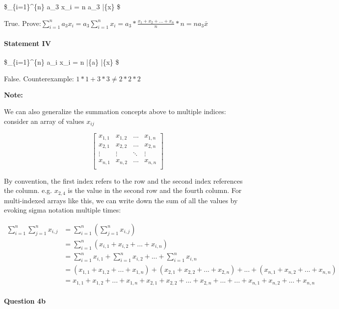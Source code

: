 \documentclass[11pt]{article}
\begin{document}
\$\sum\_\{i=1\}\^{}\{n\} a\_3 x\_i = n a\_3 \bar\{x\} \$

    True.
Prove:\(\sum_{i=1}^na_3x_i=a_3\sum_{i=1}^nx_i=a_3*\frac{x_1+x_2+...+x_n}{n}*n=na_3\bar x\)

    \paragraph{Statement IV}\label{statement-iv}

\$\sum\_\{i=1\}\^{}\{n\} a\_i x\_i = n \bar\{a\} \bar\{x\} \$

    False. Counterexample: \(1*1+3*3 \neq 2*2*2\)

    \textbf{Note:}

We can also generalize the summation concepts above to multiple indices:
consider an array of values \(x_{ij}\)

\[ \begin{bmatrix} x_{1,1} & x_{1, 2} & ... & x_{1, n} \\ 
x_{2,1} & x_{2, 2} & ... & x_{2, n} \\ 
\vdots  & \vdots   & \ddots & \vdots   \\ 
x_{n,1} & x_{n, 2} & ... & x_{n, n} \\ 
\end{bmatrix} \]

By convention, the first index refers to the row and the second index
references the column. e.g. \(x_{2, 4}\) is the value in the second row
and the fourth column. For multi-indexed arrays like this, we can write
down the sum of all the values by evoking sigma notation multiple times:

\begin{align*} 
    \sum_{i=1}^{n} \sum_{j=1}^{n} x_{i,j}
    &= \sum_{i=1}^{n} \left(\sum_{j=1}^{n} x_{i,j} \right) \\
    &= \sum_{i=1}^{n} \left(x_{i,1} + x_{i,2} + ... + x_{i,n}\right) \\
    &= \sum_{i=1}^{n} x_{i,1} + \sum_{i=1}^{n} x_{i,2} + ... + \sum_{i=1}^{n} x_{i,n} \\
    &= \left(x_{1,1} + x_{1,2} + ... + x_{1,n}\right) + \left(x_{2,1} + x_{2,2} + ... + x_{2,n}\right) + ... +  \left(x_{n,1} + x_{n,2} + ... + x_{n,n}\right) \\
    &= x_{1,1} + x_{1,2} + ... + x_{1,n} + x_{2,1} + x_{2,2} + ... + x_{2,n} + ... + ... + x_{n,1} + x_{n,2} + ... + x_{n,n}
\end{align*}

    \paragraph{Question 4b}\label{question-4b}
\end{document}
